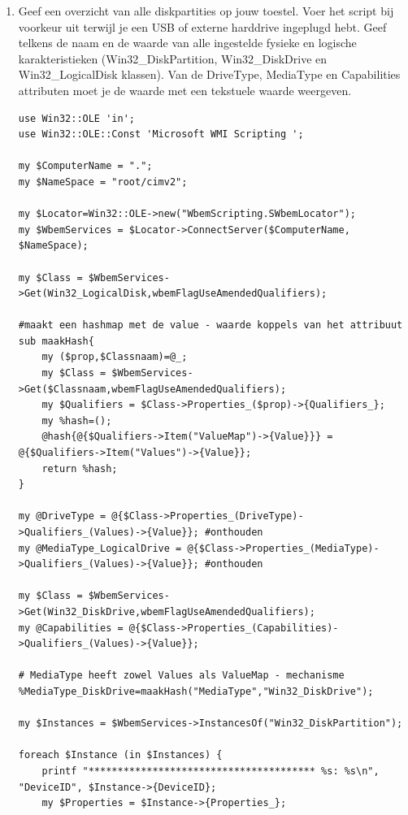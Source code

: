 \documentclass[11pt,a4paper]{report}
\begin{document}
\begin{enumerate}[resume]
\begin{lstlisting}
	if ( $Qualifiers->Item(Values) && !$Qualifiers->Item(ValueMap)) {
		print "\n\n",$prop->{name};
		my $i=0; #nummering begint op 0
		foreach (@{$Qualifiers->Item(Values)->{Value}}) {
			print "\n\t$i:",$_;
			$i++;
		}
	}
}
	\end{lstlisting}
	\item Geef een overzicht van alle diskpartities op jouw toestel. Voer het script bij voorkeur uit terwijl je een USB of externe harddrive ingeplugd hebt. Geef telkens de naam en de waarde van alle ingestelde fysieke en logische karakteristieken (Win32\_DiskPartition, Win32\_DiskDrive en Win32\_LogicalDisk klassen). Van de DriveType, MediaType en Capabilities attributen moet je de waarde met een tekstuele waarde weergeven.
	\begin{lstlisting}
use Win32::OLE 'in';
use Win32::OLE::Const 'Microsoft WMI Scripting ';

my $ComputerName = ".";
my $NameSpace = "root/cimv2";

my $Locator=Win32::OLE->new("WbemScripting.SWbemLocator");
my $WbemServices = $Locator->ConnectServer($ComputerName, $NameSpace);

my $Class = $WbemServices->Get(Win32_LogicalDisk,wbemFlagUseAmendedQualifiers);

#maakt een hashmap met de value - waarde koppels van het attribuut
sub maakHash{
	my ($prop,$Classnaam)=@_;
	my $Class = $WbemServices->Get($Classnaam,wbemFlagUseAmendedQualifiers);
	my $Qualifiers = $Class->Properties_($prop)->{Qualifiers_};
	my %hash=();
	@hash{@{$Qualifiers->Item("ValueMap")->{Value}}} = @{$Qualifiers->Item("Values")->{Value}};
	return %hash;
}

my @DriveType = @{$Class->Properties_(DriveType)->Qualifiers_(Values)->{Value}}; #onthouden 
my @MediaType_LogicalDrive = @{$Class->Properties_(MediaType)->Qualifiers_(Values)->{Value}}; #onthouden

my $Class = $WbemServices->Get(Win32_DiskDrive,wbemFlagUseAmendedQualifiers);
my @Capabilities = @{$Class->Properties_(Capabilities)->Qualifiers_(Values)->{Value}};

# MediaType heeft zowel Values als ValueMap - mechanisme 
%MediaType_DiskDrive=maakHash("MediaType","Win32_DiskDrive");

my $Instances = $WbemServices->InstancesOf("Win32_DiskPartition");

foreach $Instance (in $Instances) {
	printf "*************************************** %s: %s\n", "DeviceID", $Instance->{DeviceID};
	my $Properties = $Instance->{Properties_};
	

\end{lstlisting}
\end{enumerate}
\end{document}
